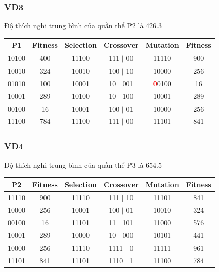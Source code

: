\documentclass{book}
\begin{document}
\subsubsection{VD3} Độ thích nghi trung bình của quần thể P2 là 426.3
\begin{table}[H]
    \centering
    \begin{tabular}{|c|c|c|c|c|c|}
    \hline
    \textbf{P1} & \textbf{Fitness} & \textbf{Selection} & \textbf{Crossover} & \textbf{Mutation} & \textbf{Fitness} \\
    \hline
    10100 & 400 & 11100 & 111 $|$ 00 & 11110 & 900 \\
    10010 & 324 & 10010 & 100 $|$ 10 & 10000 & 256 \\
    01010 & 100 & 10001 & 10 $|$ 001 & \textcolor{red}{\textbf{0}}0100 & 16 \\ %
    10001 & 289 & 10100 & 10 $|$ 100 & 10001 & 289 \\
    00100 & 16 & 10001 & 100 $|$ 01 & 10000 & 256 \\
    11100 & 784 & 11100 & 111 $|$ 00 & 11101 & 841 \\
    \hline
    \end{tabular}
\end{table}

\subsubsection{VD4} Độ thích nghi trung bình của quần thể P3 là 654.5
\begin{table}[H]
    \centering
    \begin{tabular}{|c|c|c|c|c|c|}
    \hline
    \textbf{P2} & \textbf{Fitness} & \textbf{Selection} & \textbf{Crossover} & \textbf{Mutation} & \textbf{Fitness} \\
    \hline
    11110 & 900 & 11110 & 111 $|$ 10 & 11101 & 841 \\
    10000 & 256 & 10001 & 100 $|$ 01 & 10010 & 324 \\
    00100 & 16 & 11101 & 11 $|$ 101 & 11000 & 576 \\
    10001 & 289 & 10000 & 10 $|$ 000 & 10101 & 441 \\
    10000 & 256 & 11110 & 1111 $|$ 0 & 11111 & 961 \\
    11101 & 841 & 11101 & 1110 $|$ 1 & 11100 & 784 \\
    \hline
    \end{tabular}
\end{table}
\end{document}
